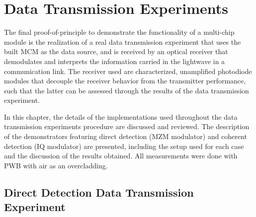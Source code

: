
\chapter{Data Transmission Experiments}
\label{ch:Evaluation}

The final proof-of-principle to demonstrate the functionality of a multi-chip module is the realization of a real data transmission experiment that uses the built MCM as the data source, and is received by an optical receiver that demodulates and interprets the information carried in the lightwave in a communication link. The receiver used are characterized, unamplified photodiode modules that decouple the receiver behavior from the transmitter performance, such that the latter can be assessed through the results of the data transmission experiment.
\par\medskip
In this chapter, the details of the implementations used throughout the data transmission experiments procedure are discussed and reviewed. The description of the demonstrators featuring direct detection (MZM modulator) and coherent detection (IQ modulator) are presented, including the setup used for each case and the discussion of the results obtained. All measurements were done with PWB with air as an overcladding.


\section{Direct Detection Data Transmission Experiment}

